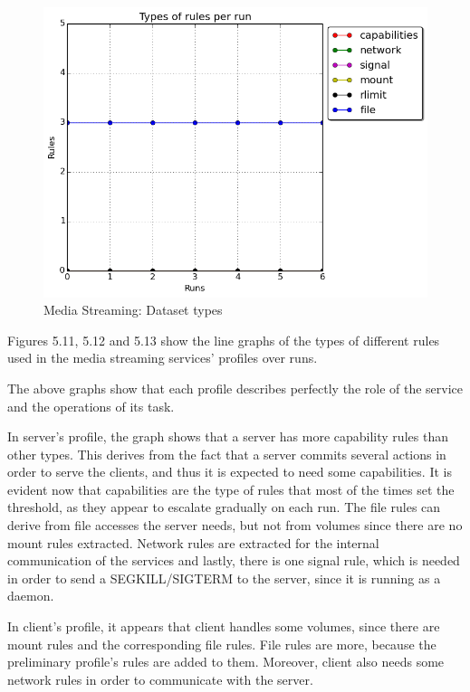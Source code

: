 \hfill\break\hfill\break\hfill\break\hfill\break\hfill\break\hfill\break\hfill\break\hfill\break\hfill\break\hfill\break\hfill\break\hfill\break\hfill\break\hfill\break\hfill\break\hfill\break\hfill\break

\begin{figure}[h!]
  \centering
   \includegraphics[width=0.7\linewidth]{../figures/mediastreaming/types_cloudsuitemedia-streamingdataset.png}
   \caption{Media Streaming: Dataset types}
\end{figure}

Figures 5.11, 5.12 and 5.13 show the line graphs of the types of different rules used in the media streaming services' profiles over runs. 

The above graphs show that each profile describes perfectly the role of the service and the operations of its task.

In server's profile, the graph shows that a server has more capability rules than other types. This derives from the fact that a server commits several actions in order to serve the clients, and thus it is expected to need some capabilities. It is evident now that capabilities are the type of rules that most of the times set the threshold, as they appear to escalate gradually on each run. The file rules can derive from file accesses the server needs, but not from volumes since there are no mount rules extracted. Network rules are extracted for the internal communication of the services and lastly, there is one signal rule, which is needed in order to send a SEGKILL/SIGTERM to the server, since it is running as a daemon.

In client's profile, it appears that client handles some volumes, since there are mount rules and the corresponding file rules. File rules are more, because the preliminary profile's rules are added to them. Moreover, client also needs some network rules in order to communicate with the server.

